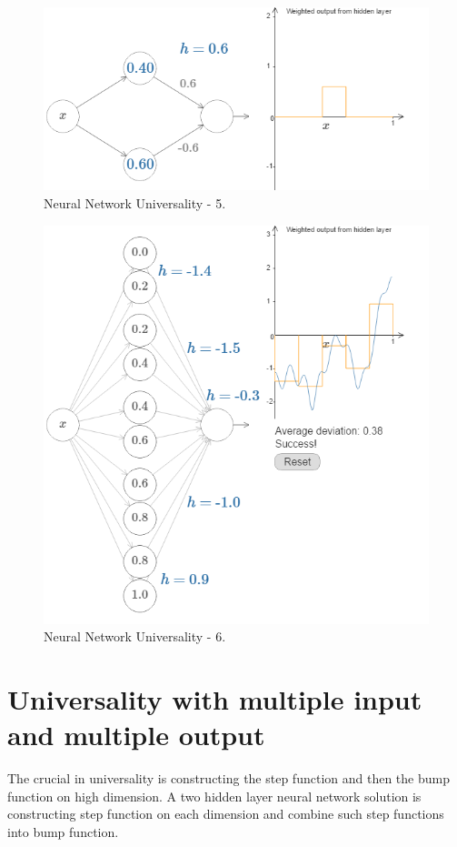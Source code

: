 \documentclass[]{book}
\begin{document}
\begin{figure}

{\centering \includegraphics[width=0.75\linewidth]{fig/04_tikz45} 

}

\caption{Neural Network Universality - 5.}\label{fig:vsnn-nnup-05}
\end{figure}

\begin{figure}

{\centering \includegraphics[width=0.75\linewidth]{fig/04_tikz46} 

}

\caption{Neural Network Universality - 6.}\label{fig:vsnn-nnup-06}
\end{figure}

\section{Universality with multiple input and multiple
output}\label{universality-with-multiple-input-and-multiple-output}

The crucial in universality is constructing the step function and then
the bump function on high dimension. A two hidden layer neural network
solution is constructing step function on each dimension and combine
such step functions into bump function.
\end{document}
